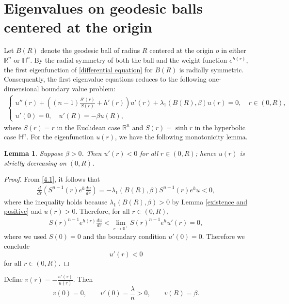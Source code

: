 \documentclass[11pt,leqno]{amsart}
\newtheorem{lemma}{Lemma}[section]
\def\R{\mathbb{R}}
\numberwithin{equation}{section}
\begin{document}
\section{Eigenvalues on geodesic balls centered at the origin}\label{sect4}
Let $B(R)$ denote  the geodesic ball of radius $R$ centered at the origin $o$  in either $\R^n$ or $\mathbb{H}^n$. By the radial symmetry of both the ball  and  the weight function $e^{h(r)}$, the first eigenfunction of \eqref{differential equation} for $B(R)$ is radially symmetric. Consequently, the first eigenvalue equations reduces to the following one-dimensional boundary value problem:
\begin{align}\label{4.1}
    \begin{cases}
   u''(r)+\left((n-1)\frac{S'(r)}{S(r)}+h'(r)\right)u'(r)+\lambda_1(B(R), \beta) u(r)=0, \quad r\in (0, R),\\
   u'(0)=0, \quad u'(R)=-\beta u(R),
\end{cases}
\end{align}
where $S(r)=r$  in the Euclidean case $\R^n$ and $S(r)=\sinh r$ in the hyperbolic case $\mathbb{H}^n$. For the eigenfunction $u(r)$, we have the following monotonicity lemma.
\begin{lemma}\label{lem:radial_decreasing}
Suppose $\beta>0$. Then $u'(r)<0$ for all $r\in (0, R)$; hence $u(r)$ is strictly decreasing on $(0, R)$.
\end{lemma}

\begin{proof}
From   \eqref{4.1}, it follows that
\begin{align*}
   \frac{d}{dr}\left(S^{n-1}(r) e^{h}\frac{du}{dr}\right) = -\lambda_1(B(R), \beta) S^{n-1}(r) e^h u < 0,
\end{align*}
where the inequality holds because 
$\lambda_1(B(R), \beta)>0$ by Lemma \ref{existence and positive} and $u(r)>0$. Therefore, for all $r\in (0, R)$,
 \begin{align*}
   S(r)^{n-1} e^{h(r)}\frac{du}{dr}<\lim_{r\to 0^+} S(r)^{n-1} e^h u'(r)=0, 
 \end{align*}
 where we used $S(0)=0$ and the boundary condition $u'(0)=0$. Therefore we conclude
 $$
 u'(r)<0
 $$
 for all $r\in (0, R)$.
\end{proof}
Define $v(r) = -\frac{u'(r)}{u(r)}$. Then 
\begin{equation}\label{eq:v-origin}
	v(0)=0,\qquad v'(0)=\frac{\lambda}{n}>0,\qquad v(R)=\beta.
\end{equation}
\end{document}
